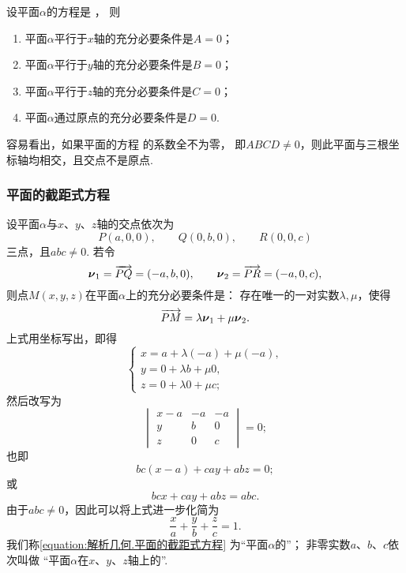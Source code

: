\begin{corollary}
设平面\(\alpha\)的方程是 ，
则\begin{enumerate}
	\item 平面\(\alpha\)平行于\(x\)轴的充分必要条件是\(A=0\)；
	\item 平面\(\alpha\)平行于\(y\)轴的充分必要条件是\(B=0\)；
	\item 平面\(\alpha\)平行于\(z\)轴的充分必要条件是\(C=0\)；
	\item 平面\(\alpha\)通过原点的充分必要条件是\(D=0\).
\end{enumerate}
\end{corollary}

容易看出，如果平面的方程  的系数全不为零，
即\(ABCD\neq0\)，则此平面与三根坐标轴均相交，且交点不是原点.

\subsubsection{平面的截距式方程}
设平面\(\alpha\)与\(x\)、\(y\)、\(z\)轴的交点依次为\[
	P(a,0,0), \qquad
	Q(0,b,0), \qquad
	R(0,0,c)
\]三点，且\(abc\neq0\).
若令\[
	\boldsymbol{\nu}_1 = \overrightarrow{PQ} = (-a,b,0), \qquad
	\boldsymbol{\nu}_2 = \overrightarrow{PR} = (-a,0,c),
\]
则点\(M(x,y,z)\)在平面\(\alpha\)上的充分必要条件是：
存在唯一的一对实数\(\lambda,\mu\)，使得\[
	\overrightarrow{PM} = \lambda \boldsymbol{\nu}_1 + \mu \boldsymbol{\nu}_2.
\]
上式用坐标写出，即得\[
	\left\{ \begin{array}{l}
		x = a + \lambda (-a) + \mu(-a), \\
		y = 0 + \lambda b + \mu 0, \\
		z = 0 + \lambda 0 + \mu c;
	\end{array} \right.
\]然后改写为\[
	\begin{vmatrix}
		x-a & -a & -a \\
		y & b & 0 \\
		z & 0 & c
	\end{vmatrix} = 0;
\]也即\[
	bc (x-a) + ca y + ab z = 0;
\]或\[
	bc x + ca y + ab z = abc.
\]
由于\(abc\neq0\)，因此可以将上式进一步化简为
\begin{equation}\label{equation:解析几何.平面的截距式方程}
	\frac{x}{a} + \frac{y}{b} + \frac{z}{c} = 1.
\end{equation}
我们称\cref{equation:解析几何.平面的截距式方程}
为“平面\(\alpha\)的”；
非零实数\(a\)、\(b\)、\(c\)依次叫做
“平面\(\alpha\)在\(x\)、\(y\)、\(z\)轴上的”.

